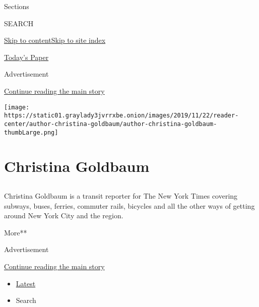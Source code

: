 Sections

SEARCH

\protect\hyperlink{site-content}{Skip to
content}\protect\hyperlink{site-index}{Skip to site index}

\href{https://myaccount.nytimes3xbfgragh.onion/auth/login?response_type=cookie\&client_id=vi}{}

\href{https://www.nytimes3xbfgragh.onion/section/todayspaper}{Today's
Paper}

Advertisement

\protect\hyperlink{after-top}{Continue reading the main story}

\texttt{[image: https://static01.graylady3jvrrxbe.onion/images/2019/11/22/reader-center/author-christina-goldbaum/author-christina-goldbaum-thumbLarge.png]}

\hypertarget{christina-goldbaum}{%
\section{Christina Goldbaum}\label{christina-goldbaum}}

\subsection{}

Christina Goldbaum is a transit reporter for The New York Times covering
subways, buses, ferries, commuter rails, bicycles and all the other ways
of getting around New York City and the region.~

More**

Advertisement

\protect\hyperlink{after-mid1}{Continue reading the main story}

\begin{itemize}
\tightlist
\item
  \protect\hyperlink{stream-panel}{Latest}
\item
  Search
\end{itemize}

